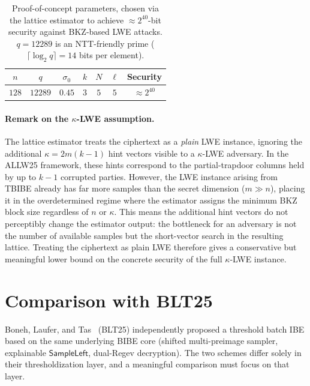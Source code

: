 \begin{table}[h]
\centering
\renewcommand{\arraystretch}{1.25}
\begin{tabular}{|c|c|c|c|c|c|c|}
\hline
$n$ & $q$ & $\sigma_0$ & $k$ & $N$ & $\ell$ & Security \\
\hline
$128$ & $12289$ & $0.45$ & $3$ & $5$ & $5$ & $\approx 2^{40}$ \\
\hline
\end{tabular}
\caption{Proof-of-concept parameters, chosen via the lattice estimator to achieve
$\approx 2^{40}$-bit security against BKZ-based LWE attacks.
$q=12289$ is an NTT-friendly prime ($\lceil\log_2 q\rceil=14$ bits per element).}
\label{tab:poc-params}
\end{table}

\paragraph{Remark on the $\kappa$-LWE assumption.}
The lattice estimator treats the ciphertext as a \emph{plain} LWE instance, ignoring the
additional $\kappa=2m(k-1)$ hint vectors visible to a $\kappa$-LWE adversary.
In the ALLW25 framework, these hints correspond to the partial-trapdoor columns held by
up to $k-1$ corrupted parties.
However, the LWE instance arising from
TBIBE already has far more samples than the secret dimension ($m \gg n$), placing it in
the overdetermined regime where the estimator assigns the minimum BKZ block size
regardless of $n$ or $\kappa$.
This means the additional hint vectors do not perceptibly change the estimator output:
the bottleneck for an adversary is not the number of available samples but the short-vector
search in the resulting lattice.
Treating the ciphertext as plain LWE therefore gives a conservative but meaningful
lower bound on the concrete security of the full $\kappa$-LWE instance.

\section{Comparison with \textsf{BLT25}}
\label{sec:comparison-blt25}

Boneh, Laufer, and Tas~\cite{EPRINT:BonLauTas25} (\textsf{BLT25}) independently
proposed a threshold batch IBE based on the same underlying BIBE core
(shifted multi-preimage sampler, explainable $\mathsf{SampleLeft}$, dual-Regev decryption).
The two schemes differ solely in their thresholdization layer, and a meaningful comparison
must focus on that layer.

